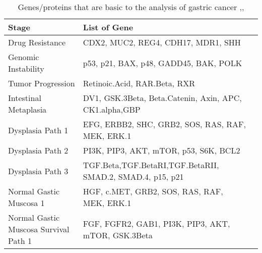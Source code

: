 \begin{table}[H]\tiny
	\caption{Genes/proteins that are basic to the analysis of gastric cancer \cite{key400},\cite{key401},\cite{key402}}	
	\begin{tabular}{p{3cm}p{3cm}p{1cm}}
		\hline
		Stage & List of Gene & \\
		\hline 
		Drug Resistance & CDX2, MUC2, REG4, CDH17, MDR1, SHH \\
		Genomic Instability & p53, p21, BAX, p48, GADD45, BAK, POLK \\
		Tumor Progression & Retinoic.Acid, RAR.Beta, RXR \\
		Intestinal Metaplasia & DV1, GSK.3Beta, Beta.Catenin, Axin, APC, CK1.alpha,GBP \\
		Dysplasia Path 1 & EFG, ERBB2, SHC, GRB2, SOS, RAS, RAF, MEK, ERK.1 \\
		Dysplasia Path 2 & PI3K, PIP3, AKT, mTOR, p53, S6K, BCL2 \\
		Dysplasia Path 3 & TGF.Beta,TGF.BetaRI,TGF.BetaRII, SMAD.2, SMAD.4, p15, p21 \\
		Normal Gastic Muscosa 1 & HGF, c.MET, GRB2, SOS, RAS, RAF, MEK, ERK.1 \\
		Normal Gastic Muscosa Survival Path 1 & FGF, FGFR2, GAB1, PI3K, PIP3, AKT, mTOR, GSK.3Beta \\
		\hline  
	\end{tabular}
\end{table} 


